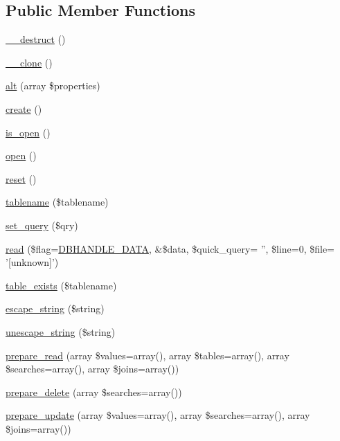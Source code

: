\subsection*{Public Member Functions}
\begin{DoxyCompactItemize}
\item 
\hyperlink{classDbHandler_a7cd6bd727d1f296eb5dbfae6ca36ab3f}{\_\-\_\-destruct} ()
\item 
\hyperlink{classDbHandler_ada20e62b915bc87a1de28389a2ee81e1}{\_\-\_\-clone} ()
\item 
\hyperlink{classDbHandler_ac3a8e0bfe2491e17bc527715505f90a7}{alt} (array \$properties)
\item 
\hyperlink{classDbHandler_ac9e93cb0ab57f03b2719eebd0c0ee2ef}{create} ()
\item 
\hyperlink{classDbHandler_aa342b2bd73c5f8ce05cadcba02f9cf5a}{is\_\-open} ()
\item 
\hyperlink{classDbHandler_afccbfc69ead84f8445116e050d1cfc2d}{open} ()
\item 
\hyperlink{classDbHandler_a9982df4830f05803935bb31bac7fae3d}{reset} ()
\item 
\hyperlink{classDbHandler_abaca15a312800e5522b3efd9dff036f5}{tablename} (\$tablename)
\item 
\hyperlink{classDbHandler_a305a3225c4760a88a06b0d55d0893962}{set\_\-query} (\$qry)
\item 
\hyperlink{classDbHandler_a5ebfdc2acfcb0e9cbc2861fc55c7127c}{read} (\$flag=\hyperlink{class_8dbhandler_8php_acc5178c2a582eafa4ef488ed3394b725}{DBHANDLE\_\-DATA}, \&\$data, \$quick\_\-query= '', \$line=0, \$file= '\mbox{[}unknown\mbox{]}')
\item 
\hyperlink{classDbHandler_a11e750a2c46022241eba49df81607ba9}{table\_\-exists} (\$tablename)
\item 
\hyperlink{classDbHandler_a67d77702ff6db70f89123d3f947af143}{escape\_\-string} (\$string)
\item 
\hyperlink{classDbHandler_a27c604b14c39913d34630e5504979b15}{unescape\_\-string} (\$string)
\item 
\hyperlink{classDbHandler_a2d8dd22e7e74b48db269ec1f53b8e549}{prepare\_\-read} (array \$values=array(), array \$tables=array(), array \$searches=array(), array \$joins=array())
\item 
\hyperlink{classDbHandler_a11a0d416e8993b919c9fec6f15dacbc5}{prepare\_\-delete} (array \$searches=array())
\item 
\hyperlink{classDbHandler_a2e6560a5c8cc01339346bc1a74e21337}{prepare\_\-update} (array \$values=array(), array \$searches=array(), array \$joins=array())

\end{DoxyCompactItemize}
